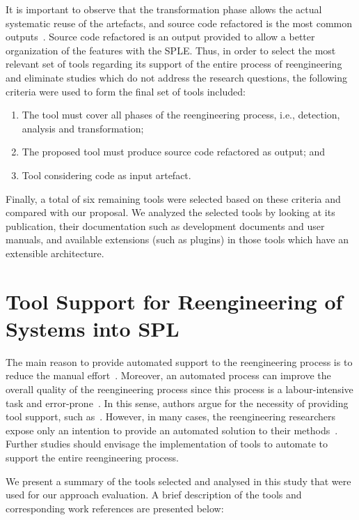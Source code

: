 It is important to observe that the transformation phase allows the actual systematic reuse of the artefacts, and source code refactored is the most common outputs~\cite{Assuncao2017}. Source code refactored is an output provided to allow a better organization of the features with the SPLE. Thus, in order to select the most relevant set of tools regarding its support of the entire process of reengineering and eliminate studies which do not address the research questions, the following criteria were used to form the final set of tools included:

\begin{enumerate}
    \item The tool must cover all phases of the reengineering process, i.e., detection, analysis and transformation;
    \item The proposed tool  must produce source code refactored as output; and
    \item Tool considering code as input artefact. 
\end{enumerate}

Finally, a total of six remaining tools were selected based on these criteria and compared with our proposal. We analyzed the selected tools by looking at its publication, their documentation such as development documents and user manuals, and available extensions (such as plugins) in those tools which have an extensible architecture.

\section{Tool Support for Reengineering of Systems into SPL} \label{sec-ch5:spl_reengineering}

The main reason to provide automated support to the reengineering process is to reduce the manual effort~\cite{Martinez2014, Abbasi2014}. Moreover, an automated process can improve the overall quality of the reengineering process since this process is a labour-intensive task and error-prone~\cite{Stoermer2001}.  In this sense, authors argue for the necessity of providing tool support, such as~\cite{Sampath2014, Passos2013, Zhang2011, Acher2013}. However,  in many cases, the reengineering researchers expose only an intention to provide an automated solution to their methods~\cite{Assuncao2017}. Further studies should envisage the implementation of tools to automate to support the entire reengineering process. 

We present a summary of the tools selected and analysed in this study that were used for our approach evaluation. A brief description of the tools and corresponding work references are presented below:

